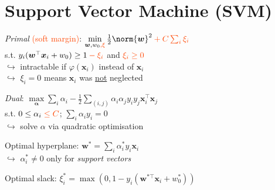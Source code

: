 \section{Support Vector Machine (SVM)}

\iffalse
    \textit{Primal}: \: $\min\limits_{\bm w, w_0} \frac12 \norm{\bm w}^2$ \: s.t. \: $y_i(\bm w^\top \bm x_i + w_0) \geq 1$\\
    \quad $\hookrightarrow$ intractable if $\varphi(\bm x_i)$ instead of $\bm x_i$
    
    \textit{Dual}: \: $\max\limits_{\bm\alpha} \sum_i \alpha_i - \frac12 \sum_{i,j} \alpha_i \alpha_j y_i y_j \bm x_i^\top \bm x_j$\\
    \qquad\qquad s.t. \: $\alpha_i \geq 0$; \: $\sum_i \alpha_i y_i = 0$\\
    \quad $\hookrightarrow$ solve $\alpha$ via quadratic optimisation
    
    Optimal hyperplane: \: $\bm w^\ast = \sum_i \alpha_i^\ast y_i \bm x_i$\\
    \quad $\hookrightarrow$ $\alpha_i^\ast \neq 0$ only for \textit{support vectors}
\fi

\textit{Primal} \textcolor{OrangeRed}{(soft margin)}: \: $\min\limits_{\bm w, w_0 \color{OrangeRed}, \xi} \frac12 \norm{\bm w}^2 \color{OrangeRed} + C\sum_i \xi_i$\\
\qquad s.t. \: $y_i(\bm w^\top \bm x_i + w_0) \geq 1 \color{OrangeRed} - \xi_i$ \: and \: $\color{OrangeRed} \xi_i \geq 0$\\
\quad $\hookrightarrow$ intractable if $\varphi(\bm x_i)$ instead of $\bm x_i$\\
\quad $\hookrightarrow$ $\xi_i = 0$ means $\bm x_i$ was \underline{not} neglected

\textit{Dual}: \: $\max\limits_{\bm\alpha} \sum_i \alpha_i - \frac12 \sum_{(i,j)} \alpha_i \alpha_j y_i y_j \bm x_i^\top \bm x_j$\\
\qquad\qquad s.t. \: $0 \leq \alpha_i \color{OrangeRed} \leq C$; \: $\sum_i \alpha_i y_i = 0$\\
\quad $\hookrightarrow$ solve $\alpha$ via quadratic optimisation

Optimal hyperplane: \: $\bm w^\ast = \sum_i \alpha_i^\ast y_i \bm x_i$\\
\quad $\hookrightarrow$ $\alpha_i^\ast \neq 0$ only for \textit{support vectors}

Optimal slack: \: $\xi_i^\ast = \max(0, 1 - y_i(\bm w^{\ast\top} \!\bm x_i {+} w_0^\ast))$

